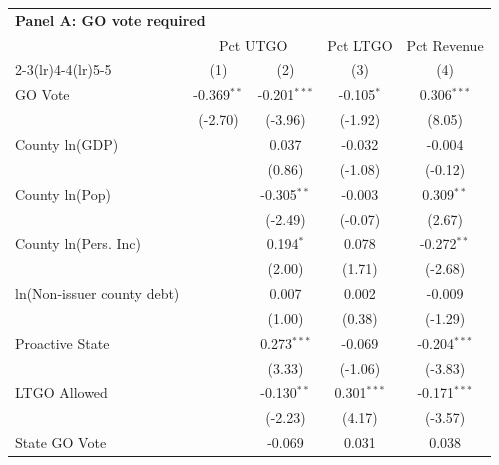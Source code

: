 \begingroup
\centering
\begin{tabular*}{\textwidth}{@{\extracolsep{\fill}}lcccc}
\multicolumn{5}{l}{\textbf{Panel A: GO vote required}}\\

\addlinespace
   \toprule
    & \multicolumn{2}{c}{Pct UTGO} & Pct LTGO & Pct Revenue\\
   \cmidrule(lr){2-3}\cmidrule(lr){4-4}\cmidrule(lr){5-5}
                              & (1)           & (2)            & (3)           & (4)\\  
   \midrule 
   GO Vote                    & -0.369$^{**}$ & -0.201$^{***}$ & -0.105$^{*}$  & 0.306$^{***}$\\   
                              & (-2.70)      & (-3.96)       & (-1.92)      & (8.05)\\   
   County ln(GDP)             &               & 0.037          & -0.032        & -0.004\\   
                              &               & (0.86)        & (-1.08)      & (-0.12)\\   
   County ln(Pop)             &               & -0.305$^{**}$  & -0.003        & 0.309$^{**}$\\   
                              &               & (-2.49)       & (-0.07)      & (2.67)\\   
   County ln(Pers. Inc)       &               & 0.194$^{*}$    & 0.078         & -0.272$^{**}$\\   
                              &               & (2.00)        & (1.71)       & (-2.68)\\   
   ln(Non-issuer county debt) &               & 0.007          & 0.002         & -0.009\\   
                              &               & (1.00)        & (0.38)       & (-1.29)\\   
   Proactive State            &               & 0.273$^{***}$  & -0.069        & -0.204$^{***}$\\   
                              &               & (3.33)        & (-1.06)      & (-3.83)\\   
   LTGO Allowed               &               & -0.130$^{**}$  & 0.301$^{***}$ & -0.171$^{***}$\\   
                              &               & (-2.23)       & (4.17)       & (-3.57)\\   
   State GO Vote              &               & -0.069         & 0.031         & 0.038\\   

\end{tabular*}
